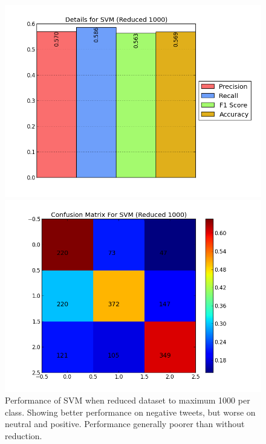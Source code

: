 \begin{figure}[!htb]
	\centering
	\begin{minipage}{.45\linewidth}
		\includegraphics[width=\linewidth]{../img/plots/analysis/svm_stats_best_reduced_1000.png}
	\end{minipage}
	\hspace{0.05\linewidth}
	\begin{minipage}{.45\linewidth}
		\includegraphics[width=\linewidth]{../img/plots/analysis/svm_confusion_matrix_best_reduced_1000.png}
	\end{minipage}
	\caption[Performance of SVM when reduced dataset to max 1000 per class]{Performance of SVM when reduced dataset to maximum 1000 per class. Showing better performance on negative tweets, but worse on neutral and positive. Performance generally poorer than without reduction.}
	\label{fig:svm_reduced_1000}
\end{figure}

